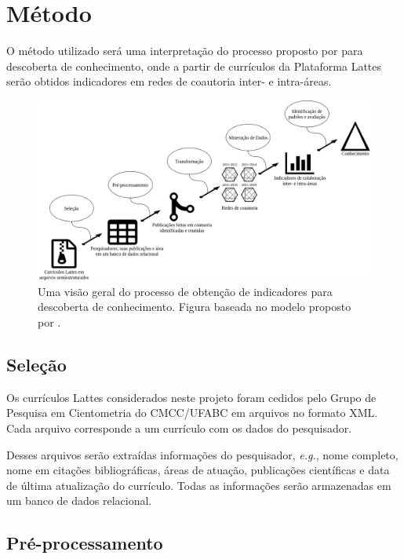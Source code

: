 \chapter[Método]{Método}

O método utilizado será uma interpretação do processo proposto por  para descoberta de conhecimento, onde a partir de currículos da Plataforma Lattes serão obtidos indicadores em redes de coautoria inter- e intra-áreas.

\begin{figure}[htpb]
   \centering
   \includegraphics[scale=.3]{figs/fayyad-diagram-graph}
   \caption{Uma visão geral do processo de obtenção de indicadores para descoberta de conhecimento. Figura baseada no modelo proposto por .}
   \label{fig:processo}
\end{figure}

\section{Seleção}

Os currículos Lattes considerados neste projeto foram cedidos pelo Grupo de Pesquisa em Cientometria do CMCC/UFABC em arquivos no formato XML. Cada arquivo corresponde a um currículo com os dados do pesquisador.

Desses arquivos serão extraídas informações do pesquisador, \textit{e.g.}, nome completo, nome em citações bibliográficas, áreas de atuação, publicações científicas e data de última atualização do currículo. Todas as informações serão armazenadas em um banco de dados relacional.

\section{Pré-processamento}

